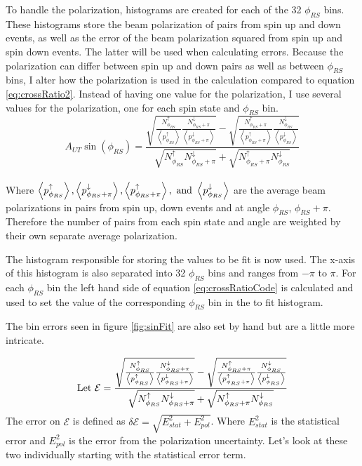 \documentclass[abstract = on,listof=totoc, bibliography=totoc]{scrreprt}
\newcommand{\phirs}{\phi_{RS}}
\begin{document}
To handle the polarization, histograms are created for each of the 32 $\phirs$ bins. These histograms store the beam polarization of pairs from spin up and down events, as well as the error of the beam polarization squared from spin up and spin down events. The latter will be used when calculating errors. Because the polarization can differ between spin up and down pairs as well as between $\phirs$ bins, I alter how the polarization is used in the calculation compared to equation \ref{eq:crossRatio2}. Instead of having one value for the polarization, I use several values for the polarization, one for each spin state and $\phirs$ bin.    
\begin{equation}
\label{eq:crossRatioCode}
A_{UT}\sin(\phi_{RS} ) = \frac{\sqrt{\frac{N^\uparrow_{\phi_{RS}}}{\left<p^\uparrow_{\phirs}\right>} \frac{N^\downarrow_{\phi_{RS}+\pi}}{\left<p^\downarrow_{\phirs+\pi}\right>}} - \sqrt{\frac{N^\uparrow_{\phi_{RS}+\pi}}{\left<p^\uparrow_{\phirs+\pi}\right>} \frac{N^\downarrow_{\phi_{RS}}}{\left<p^\downarrow_{\phirs}\right>}}}       {\sqrt{N^\uparrow_{\phi_{RS}} N^\downarrow_{\phi_{RS}+\pi}} + \sqrt{N^\uparrow_{\phi_{RS}+\pi} N^\downarrow_{\phi_{RS}}}}
\end{equation}\\
%
Where $\left<p^\uparrow_{\phirs}\right>, \left<p^\downarrow_{\phirs+\pi}\right>, \left<p^\uparrow_{\phirs+\pi}\right>, \textnormal{ and } \left<p^\downarrow_{\phirs}\right>$ are the average beam polarizations in pairs from spin up, down events and at angle $\phirs$, $\phirs + \pi$. Therefore the number of pairs from each spin state and angle are weighted by their own separate average polarization.   

The histogram responsible for storing the values to be fit is now used. The x-axis of this histogram is also separated into 32 $\phirs$ bins and ranges from $-\pi$ to $\pi$. For each $\phirs$ bin the left hand side of equation \ref{eq:crossRatioCode} is calculated and used to set the value of the corresponding $\phirs$ bin in the to fit histogram.

The bin errors seen in figure \ref{fig:sinFit} are also set by hand but are a little more intricate. 

\begin{equation}
\label{eq:epsilon}
\textnormal{Let } \mathcal{E} = \frac{\sqrt{\frac{N^\uparrow_{\phi_{RS}}}{\left<p^\uparrow_{\phirs}\right>} \frac{N^\downarrow_{\phi_{RS}+\pi}}{\left<p^\downarrow_{\phirs+\pi}\right>}} - \sqrt{\frac{N^\uparrow_{\phi_{RS}+\pi}}{\left<p^\uparrow_{\phirs+\pi}\right>} \frac{N^\downarrow_{\phi_{RS}}}{\left<p^\downarrow_{\phirs}\right>}}}       {\sqrt{N^\uparrow_{\phi_{RS}} N^\downarrow_{\phi_{RS}+\pi}} + \sqrt{N^\uparrow_{\phi_{RS}+\pi} N^\downarrow_{\phi_{RS}}}}
\end{equation}
The error on $\mathcal{E}$ is defined as $\delta \mathcal{E} = \sqrt{E^2_{stat} + E^2_{pol}}$. Where $E^2_{stat}$ is the statistical error and $E^2_{pol}$ is the error from the polarization uncertainty. Let's look at these two individually starting with the statistical error term.
\end{document}
